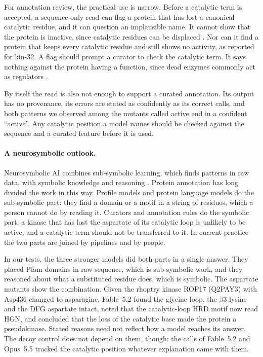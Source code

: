 \documentclass[11pt]{article}
\begin{document}
For annotation review, the practical use is narrow. Before a catalytic term is accepted, a sequence-only
read can flag a protein that has lost a canonical catalytic residue, and it can question an implausible
name. It cannot show that the protein is inactive, since catalytic residues can be displaced
\citep{goldberg2023pseudoenzymes}. Nor can it find a protein that keeps every catalytic residue and
still shows no activity, as reported for kin-32. A flag should prompt a curator to check the catalytic term. It says nothing against the
protein having a function, since dead enzymes commonly act as regulators \citep{adrain2020dead}.

By itself the read is also not enough to support a curated annotation. Its output has no provenance, its errors are stated as
confidently as its correct calls, and both patterns we observed among the mutants called active end in a
confident ``active''. Any
catalytic position a model names should be checked against the sequence and a curated feature before it
is used.

\paragraph{A neurosymbolic outlook.} Neurosymbolic AI combines sub-symbolic learning, which finds patterns
in raw data, with symbolic knowledge and reasoning \citep{garcez2023neurosymbolic,kautz2022third}. Protein
annotation has long divided the work in this way. Profile models and protein language models do the
sub-symbolic part: they find a domain or a motif in a string of residues, which a person cannot do by
reading it. Curators and annotation rules do the symbolic part: a kinase that has lost the aspartate of
its catalytic loop is unlikely to be active, and a catalytic term should not be transferred to it. In
current practice the two parts are joined by pipelines and by people.

In our tests, the three stronger models did both parts in a single answer. They placed Pfam domains in
raw sequence, which is sub-symbolic work, and they reasoned about what a substituted residue does, which
is symbolic. The aspartate mutants show the combination. Given
the rhoptry kinase ROP17 (Q2PAY3) with Asp436 changed to asparagine, Fable~5.2 found the glycine loop,
the $\beta$3 lysine and the DFG aspartate intact, noted that the catalytic-loop HRD motif now read HGN,
and concluded that the loss of the catalytic base made the protein a pseudokinase. Stated
reasons need not reflect how a model reaches its answer. The decoy control does not depend on them,
though: the calls of Fable~5.2 and Opus~5.5 tracked the catalytic position whatever explanation came
with them.
\end{document}
